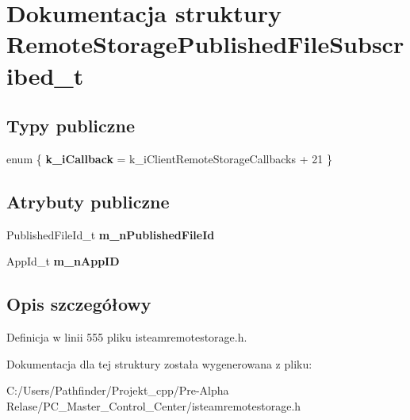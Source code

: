 \hypertarget{struct_remote_storage_published_file_subscribed__t}{}\section{Dokumentacja struktury Remote\+Storage\+Published\+File\+Subscribed\+\_\+t}
\label{struct_remote_storage_published_file_subscribed__t}
\subsection*{Typy publiczne}
\begin{DoxyCompactItemize}
\item 
\mbox{\label{struct_remote_storage_published_file_subscribed__t_ac412691d333c07142c45465149655648}} 
enum \{ {\bfseries k\+\_\+i\+Callback} = k\+\_\+i\+Client\+Remote\+Storage\+Callbacks + 21
 \}
\end{DoxyCompactItemize}
\subsection*{Atrybuty publiczne}
\begin{DoxyCompactItemize}
\item 
\mbox{\label{struct_remote_storage_published_file_subscribed__t_a8746e1ea3dcf44e58bc44d4b1b4802f4}} 
Published\+File\+Id\+\_\+t {\bfseries m\+\_\+n\+Published\+File\+Id}
\item 
\mbox{\label{struct_remote_storage_published_file_subscribed__t_a61b31398ce212c4a65758ec1799619aa}} 
App\+Id\+\_\+t {\bfseries m\+\_\+n\+App\+ID}
\end{DoxyCompactItemize}


\subsection{Opis szczegółowy}


Definicja w linii 555 pliku isteamremotestorage.\+h.



Dokumentacja dla tej struktury została wygenerowana z pliku\+:\begin{DoxyCompactItemize}
\item 
C\+:/\+Users/\+Pathfinder/\+Projekt\+\_\+cpp/\+Pre-\/\+Alpha Relase/\+P\+C\+\_\+\+Master\+\_\+\+Control\+\_\+\+Center/isteamremotestorage.\+h\end{DoxyCompactItemize}
